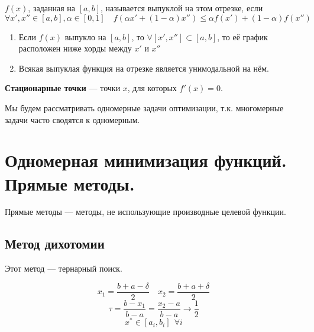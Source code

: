 \begin{definition}
    \(f(x)\), заданная на \([a, b]\), называется выпуклой на этом отрезке, если
    \[\forall x', x''\in [a, b], \alpha\in[0,1] \quad f(\alpha x' + (1 - \alpha)x'') \leq \alpha f(x') + (1 - \alpha)f(x'')\]
\end{definition}

\begin{prop}\itemfix
    \begin{enumerate}
        \item Если \(f(x)\) выпукло на \([a, b]\), то \(\forall [x', x''] \subset [a, b]\), то её график расположен ниже хорды между \(x'\) и \(x''\)
        \item Всякая выпуклая функция на отрезке является унимодальной на нём.
    \end{enumerate}
\end{prop}

\begin{definition}
    \textbf{Стационарные точки} --- точки \(x\), для которых \(f'(x) = 0\).
\end{definition}

Мы будем рассматривать одномерные задачи оптимизации, т.к. многомерные задачи часто сводятся к одномерным.

\section{Одномерная минимизация функций. Прямые методы.}

Прямые методы --- методы, не использующие производные целевой функции.

\subsection{Метод дихотомии}

Этот метод --- тернарный поиск.

\[x_1 = \frac{b + a - \delta}{2} \quad x_2 = \frac{b + a + \delta}{2}\]
\[\tau = \frac{b - x_1}{b - a} = \frac{x_2 - a}{b - a} \to \frac{1}{2}\]
\[x^* \in [a_i, b_i] \ \ \forall i\]

